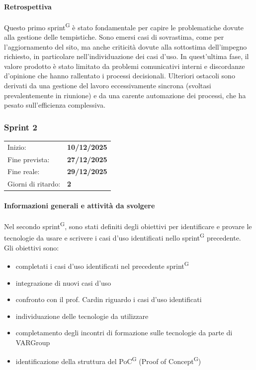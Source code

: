 \documentclass[a4paper, 11pt]{article}
\newcommand{\subsubsubsection}[1]{\paragraph{#1}}
\begin{document}
\subsubsubsection{Retrospettiva}
Questo primo sprint\textsuperscript{G} è stato fondamentale per capire le problematiche dovute alla gestione delle tempistiche. Sono emersi casi di sovrastima, come per l'aggiornamento del sito, ma anche criticità dovute alla sottostima dell'impegno richiesto, in particolare nell'individuazione dei casi d'uso. In quest'ultima fase, il valore prodotto è stato limitato da problemi comunicativi interni e discordanze d'opinione che hanno rallentato i processi decisionali. Ulteriori ostacoli sono derivati da una gestione del lavoro eccessivamente sincrona (svoltasi prevalentemente in riunione) e da una carente automazione dei processi, che ha pesato sull'efficienza complessiva.









\newpage













\subsubsection{Sprint 2}
\begin{tabular}{ll}
Inizio: & \textbf{10/12/2025} \\
Fine prevista: & \textbf{27/12/2025} \\
Fine reale: & \textbf{29/12/2025} \\
Giorni di ritardo: & \textbf{2} \\
\end{tabular}


\subsubsubsection{Informazioni generali e attività da svolgere}
Nel secondo sprint\textsuperscript{G}, sono stati definiti degli obiettivi per identificare e provare le tecnologie da usare
 e scrivere i casi d'uso identificati nello sprint\textsuperscript{G} precedente. \\
Gli obiettivi sono:
\begin{itemize}
  \item completati i casi d'uso identificati nel precedente sprint\textsuperscript{G}
  \item integrazione di nuovi casi d'uso
  \item confronto con il prof. Cardin riguardo i casi d'uso identificati
  \item individuazione delle tecnologie da utilizzare
  \item completamento degli incontri di formazione sulle tecnologie da parte di VARGroup
  \item identificazione della struttura del PoC\textsuperscript{G} (Proof of Concept\textsuperscript{G})
\end{itemize}
\end{document}
